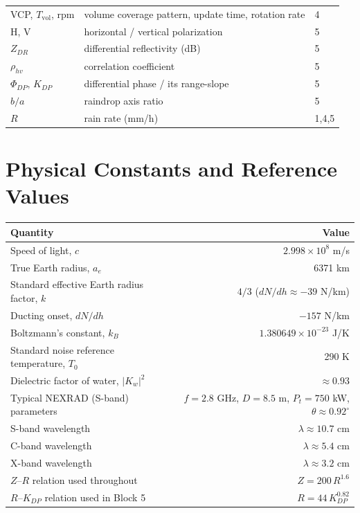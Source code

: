 \documentclass[11pt]{article}
\begin{document}
\begin{longtable}{L M L}
VCP, $T_{\mathrm{vol}}$, rpm & volume coverage pattern, update time, rotation rate & 4 \\
H, V & horizontal / vertical polarization & 5 \\
$Z_{DR}$ & differential reflectivity (dB) & 5 \\
$\rho_{hv}$ & correlation coefficient & 5 \\
$\Phi_{DP},\,K_{DP}$ & differential phase / its range-slope & 5 \\
$b/a$ & raindrop axis ratio & 5 \\
$R$ & rain rate (mm/h) & 1,4,5 \\
\bottomrule
\end{longtable}

\section{Physical Constants and Reference Values}
\begin{longtable}{L N}
\toprule
Quantity & Value \\
\midrule
\endhead
Speed of light, $c$ & $2.998\times10^{8}$ m/s \\
True Earth radius, $a_e$ & 6371 km \\
Standard effective Earth radius factor, $k$ & $4/3$ ($dN/dh\approx-39$ N/km) \\
Ducting onset, $dN/dh$ & $-157$ N/km \\
Boltzmann's constant, $k_B$ & $1.380649\times10^{-23}$ J/K \\
Standard noise reference temperature, $T_0$ & 290 K \\
Dielectric factor of water, $|K_w|^2$ & $\approx0.93$ \\
Typical NEXRAD (S-band) parameters & $f=2.8$ GHz, $D=8.5$ m, $P_t=750$ kW, $\theta\approx0.92^\circ$ \\
S-band wavelength & $\lambda\approx10.7$ cm \\
C-band wavelength & $\lambda\approx5.4$ cm \\
X-band wavelength & $\lambda\approx3.2$ cm \\
$Z$--$R$ relation used throughout & $Z = 200\,R^{1.6}$ \\
$R$--$K_{DP}$ relation used in Block 5 & $R = 44\,K_{DP}^{0.82}$ \\
\bottomrule
\end{longtable}
\end{document}
